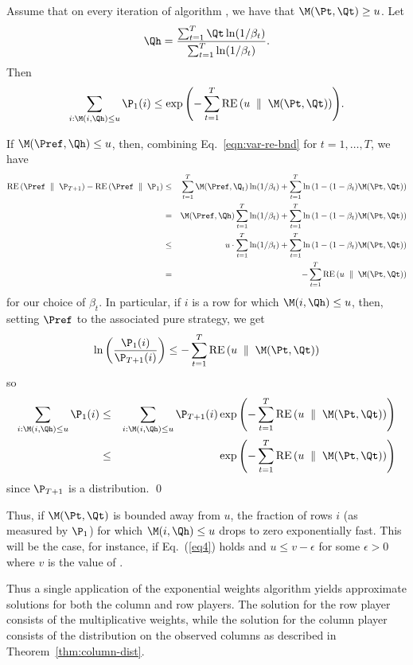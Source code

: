 \begin{theorem} \label{thm:column-dist}
Assume that on every iteration of algorithm \lwalgvar, we have that
$\M(\Pt,\Qt)\geq u$.
Let
\[
\Qh = \frac{\sum_{t=1}^T \Qt \ln(1/\beta_t)}
           {\sum_{t=1}^T \ln(1/\beta_t)}.
\]
Then
\[
\sum_{i: \M(i,\Qh) \leq u} \P_1(i)
     \leq \exp\paren{-\sum_{t=1}^T \RE{u}{\M(\Pt,\Qt)}}.
\]
\end{theorem}

\proof
If $\M(\Pref,\Qh) \leq u$, then,
combining Eq.~\ref{eqn:var-re-bnd} for $t=1,\ldots,T$, we have
\begin{eqnarray*}
\RE{\Pref}{\P_{T+1}} - \RE{\Pref}{\P_1} %
&\leq&
\sum_{t=1}^T \M(\Pref,\Q_t) \ln(1 / \beta_t)
+
\sum_{t=1}^T
   \ln \left( 1-(1-\beta_t)\M(\Pt,\Qt) \right) \\
&=&
\M(\Pref,\Qh) \sum_{t=1}^T \ln(1 / \beta_t)
+
\sum_{t=1}^T
   \ln \left( 1-(1-\beta_t)\M(\Pt,\Qt) \right)\\
&\leq&
{u\cdot \sum_{t=1}^T \ln(1 / \beta_t)
+
\sum_{t=1}^T
   \ln \left( 1-(1-\beta_t)\M(\Pt,\Qt) \right)}  \\
&=&
-\sum_{t=1}^T \RE{u}{\M(\Pt,\Qt)}
\end{eqnarray*}
for our choice of $\beta_t$.
In particular, if $i$ is a row for which $\M(i, \Qh) \leq u$, then,
setting $\Pref$ to the associated pure strategy, we get
\[
\ln\paren{\frac{\P_1(i)}{\P_{T+1}(i)}} \leq -\sum_{t=1}^T \RE{u}{\M(\Pt,\Qt)}
\]
so
\begin{eqnarray*}
\sum_{i: \M(i,\Qh) \leq u} \P_1(i)
  &\leq&
\sum_{i: \M(i,\Qh) \leq u} \P_{T+1}(i)
       \exp\paren{-\sum_{t=1}^T \RE{u}{\M(\Pt,\Qt)}} \\
 &\leq& \exp\paren{-\sum_{t=1}^T \RE{u}{\M(\Pt,\Qt)}}
\end{eqnarray*}
since $\P_{T+1}$ is a distribution.
\qed

Thus, if $\M(\Pt,\Qt)$ is bounded away from $u$, the fraction of rows
$i$ (as measured by $\P_1$) for which $\M(i,\Qh)\leq u$ drops to zero
exponentially fast.
This will be the case, for instance, if Eq.~(\ref{eq4}) holds and
$u\leq v - \epsilon$ for some $\epsilon>0$ where $v$ is the value of
\M. 

Thus a single application of the exponential weights algorithm yields
approximate solutions for both the column and row players. The
solution for the row player consists of the multiplicative weights,
while the solution for the column player consists of the distribution
on the observed columns as described in
Theorem~\ref{thm:column-dist}.

